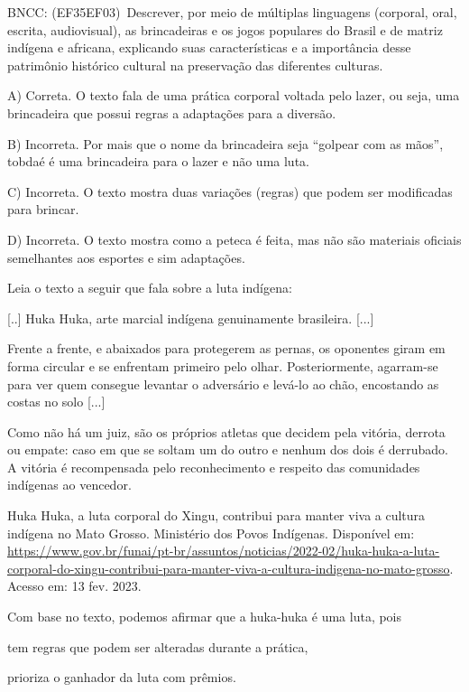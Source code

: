 {{{{{{BNCC: (EF35EF03)~Descrever, por meio de múltiplas linguagens (corporal,
oral, escrita, audiovisual), as brincadeiras e os jogos populares do
Brasil e de matriz indígena e africana, explicando suas características
e a importância desse patrimônio histórico cultural na preservação das
diferentes culturas.

A) Correta. O texto fala de uma prática corporal voltada pelo lazer, ou
seja, uma brincadeira que possui regras a adaptações para a diversão.

B) Incorreta. Por mais que o nome da brincadeira seja ``golpear com as
mãos'', tobdaé é uma brincadeira para o lazer e não uma luta.

C) Incorreta. O texto mostra duas variações (regras) que podem ser
modificadas para brincar.

D) Incorreta. O texto mostra como a peteca é feita, mas não são
materiais oficiais semelhantes aos esportes e sim adaptações.}

\num{} Leia o texto a seguir que fala sobre a luta indígena:

{[}..{]} Huka Huka, arte marcial indígena genuinamente brasileira.
{[}...{]}

Frente a frente, e abaixados para protegerem as pernas, os oponentes
giram em forma circular e se enfrentam primeiro pelo olhar.
Posteriormente, agarram-se para ver quem consegue levantar o adversário
e levá-lo ao chão, encostando as costas no solo {[}...{]}

Como não há um juiz, são os próprios atletas que decidem pela vitória,
derrota ou empate: caso em que se soltam um do outro e nenhum dos dois é
derrubado. A vitória é recompensada pelo reconhecimento e respeito das
comunidades indígenas ao vencedor.

Huka Huka, a luta corporal do Xingu, contribui para manter viva a
cultura indígena no Mato Grosso. Ministério dos Povos Indígenas.
Disponível em:
\url{https://www.gov.br/funai/pt-br/assuntos/noticias/2022-02/huka-huka-a-luta-corporal-do-xingu-contribui-para-manter-viva-a-cultura-indigena-no-mato-grosso}.
Acesso em: 13 fev. 2023.

Com base no texto, podemos afirmar que a huka-huka é uma luta, pois

\begin{escolha}
\item tem regras que podem ser alteradas durante a prática,

\item prioriza o ganhador da luta com prêmios.


\end{escolha}}}}}}
